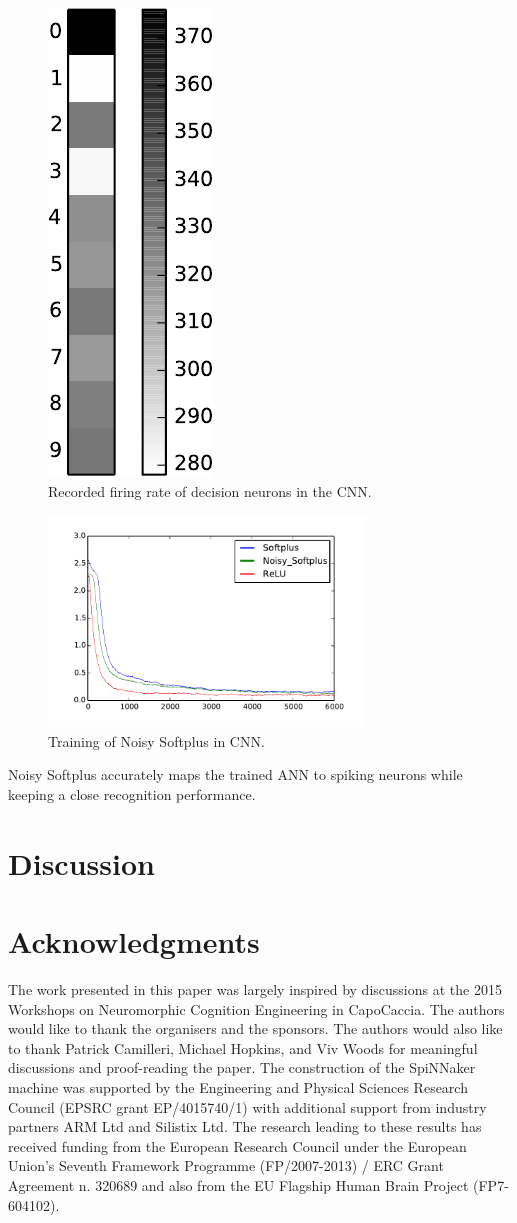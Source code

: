 \documentclass[runningheads,a4paper]{llncs}
\begin{document}
\begin{figure}[bt!]
	\centering
	\includegraphics[height=0.3\textwidth]{pic/7.pdf}
	\caption{
	Recorded firing rate of decision neurons in the CNN.}
	\label{fig:result}	
\end{figure}

\begin{figure}[bt!]
	\centering
	\includegraphics[width=0.75\textwidth]{pic/8.pdf}
	\caption{
	Training of Noisy Softplus in CNN.}
	\label{fig:training}	
\end{figure}

Noisy Softplus accurately maps the trained ANN to spiking neurons while keeping a close recognition performance.
\section{Discussion}

\section*{Acknowledgments}

The work presented in this paper was largely inspired by discussions at the 2015 Workshops on Neuromorphic Cognition Engineering in CapoCaccia.
The authors would like to thank the organisers and the sponsors.
The authors would also like to thank Patrick Camilleri, Michael Hopkins, and Viv Woods for meaningful discussions and proof-reading the paper.
The construction of the SpiNNaker machine was supported by the Engineering and Physical Sciences Research Council (EPSRC grant EP/4015740/1) with additional support from industry partners ARM Ltd and Silistix Ltd.
The research leading to these results has received funding from the European Research Council under the European Union's Seventh Framework Programme (FP/2007-2013) / ERC Grant Agreement n. 320689 and also from the EU Flagship Human Brain Project (FP7-604102). 
\end{document}
